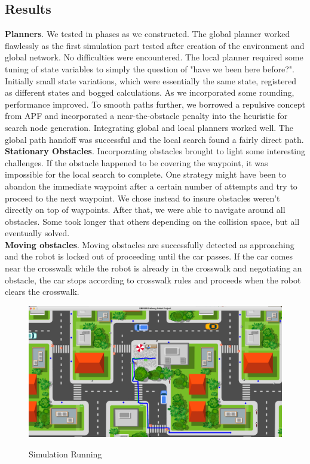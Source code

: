 \documentclass{article}
\begin{document}
\begin{multicols}{2}
\section*{Results}
\textbf{Planners}. We tested in phases as we constructed.  The global planner worked flawlessly  as the first simulation part tested after creation of the environment and global network.  No difficulties were encountered.  The local planner required some tuning of state variables to simply the question of "have we been here before?".  Initially small state variations, which were essentially the same state, registered as different states and bogged calculations.  As we incorporated some rounding, performance improved. To smooth paths further, we borrowed a repulsive concept from APF and incorporated a near-the-obstacle penalty into the heuristic for search node generation.  Integrating global and local planners worked well.  The global path handoff was successful and the local search found a fairly direct path.  \\
\noindent \textbf{Stationary Obstacles}.  Incorporating obstacles brought to light some interesting challenges.  If the obstacle happened to be covering the waypoint, it was impossible for the local search to complete.  One strategy might have been to abandon the immediate waypoint after a certain number of attempts and try to proceed to the next waypoint.  We chose instead to insure obstacles weren't directly on top of waypoints.  After that, we were able to navigate around all obstacles.  Some took longer that others depending on the collision space, but all eventually solved.  \\
\noindent \textbf{Moving obstacles}.  Moving obstacles are successfully detected as approaching and the robot is locked out of proceeding until the car passes.  If the car comes near the crosswalk while the robot is already in the crosswalk and negotiating an obstacle, the car stops according to crosswalk rules and proceeds when the robot clears the crosswalk.
\begin{figure}[H]
   \centering
    \includegraphics[width = 1\columnwidth]{figures/running.png}
     \label{fig:running}
     \caption{Simulation Running}
\end{figure}


\end{multicols}
\end{document}
